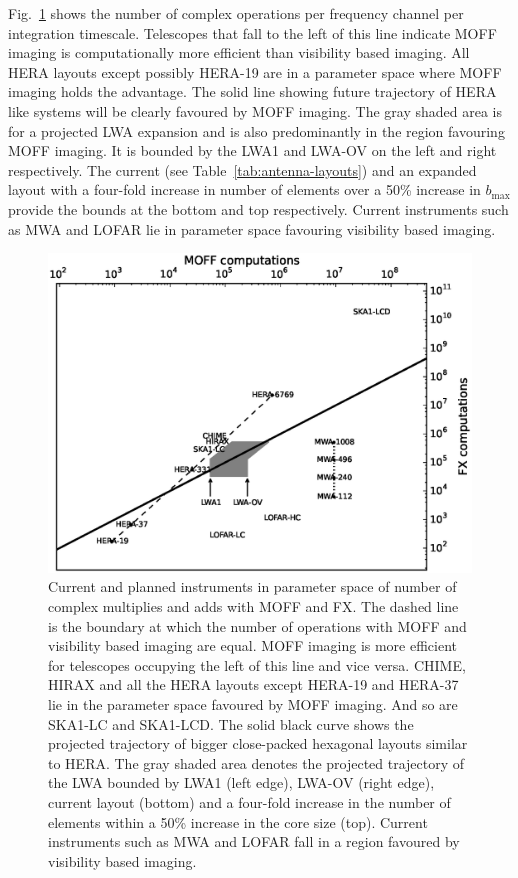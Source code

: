 \documentclass[a4paper,fleqn,usenatbib]{../mnras}
\begin{document}
Fig.~\ref{fig:parameter-space-computations-instruments} shows the number of 
complex operations per frequency channel per integration timescale. Telescopes 
that fall to the left of this line indicate MOFF imaging is computationally
more efficient than visibility based imaging. All HERA layouts except possibly
HERA-19 are in a parameter space where MOFF imaging holds the advantage. The 
solid line showing future trajectory of HERA like systems will be clearly 
favoured by MOFF imaging. The gray shaded area is for a projected LWA 
expansion and is also predominantly in the region favouring MOFF imaging. 
It is bounded by the LWA1 and LWA-OV on the left and right 
respectively. The current (see Table~\ref{tab:antenna-layouts}) and
an expanded layout with a four-fold increase in number of elements over a
50\% increase in $b_\textrm{max}$ provide the bounds at the bottom and top 
respectively. Current instruments such as MWA and LOFAR lie in parameter space
favouring visibility based imaging. 

\begin{figure}
  \includegraphics[width=\columnwidth]{MOFF_FX_computations_fov_gridding_annotated.eps}
  \caption{Current and planned instruments in parameter space of
    number of complex multiplies and adds with MOFF and FX. The dashed line
    is the boundary at which the number of operations with MOFF and visibility 
    based imaging are equal. MOFF imaging is more efficient for telescopes 
    occupying the left of this line and vice versa. CHIME, HIRAX and all the 
    HERA layouts except HERA-19 and HERA-37 lie in the parameter space favoured 
    by MOFF imaging. And so are SKA1-LC and SKA1-LCD. The solid black curve 
    shows the projected trajectory of bigger close-packed hexagonal layouts 
    similar to HERA. The gray shaded area denotes the projected trajectory of 
    the LWA bounded by LWA1 (left edge), LWA-OV (right edge), current layout 
    (bottom) and a four-fold increase in the number of elements within a 50\% 
    increase in the core size (top). Current instruments such as MWA and LOFAR 
    fall in a region favoured by visibility based imaging.}
  \label{fig:parameter-space-computations-instruments}
\end{figure}
\end{document}
